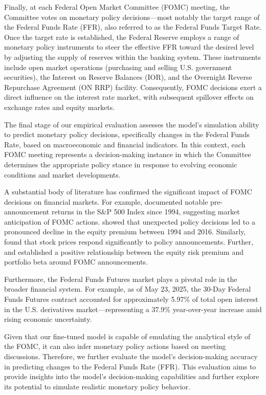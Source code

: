Finally, at each Federal Open Market Committee (FOMC) meeting, the Committee votes on monetary policy decisions—most notably the target range of the Federal Funds Rate (FFR), also referred to as the Federal Funds Target Rate. Once the target rate is established, the Federal Reserve employs a range of monetary policy instruments to steer the effective FFR toward the desired level by adjusting the supply of reserves within the banking system. These instruments include open market operations (purchasing and selling U.S. government securities), the Interest on Reserve Balances (IOR), and the Overnight Reverse Repurchase Agreement (ON RRP) facility. Consequently, FOMC decisions exert a direct influence on the interest rate market, with subsequent spillover effects on exchange rates and equity markets.


The final stage of our empirical evaluation assesses the model’s simulation ability to predict monetary policy decisions, specifically changes in the Federal Funds Rate, based on macroeconomic and financial indicators. In this context, each FOMC meeting represents a decision-making instance in which the Committee determines the appropriate policy stance in response to evolving economic conditions and market developments.


A substantial body of literature has confirmed the significant impact of FOMC decisions on financial markets. For example, \cite{lucca2015pre} documented notable pre-announcement returns in the S\&P 500 Index since 1994, suggesting market anticipation of FOMC actions. \cite{cieslak2019stock} showed that unexpected policy decisions led to a pronounced decline in the equity premium between 1994 and 2016. Similarly, \cite{madeira2019effect} found that stock prices respond significantly to policy announcements. Further, \cite{bodilsen2021asset} and \cite{liu2022recovering} established a positive relationship between the equity risk premium and portfolio beta around FOMC announcements.


Furthermore, the Federal Funds Futures market plays a pivotal role in the broader financial system. For example, as of May 23, 2025, the 30-Day Federal Funds Futures contract accounted for approximately 5.97\% of total open interest in the U.S. derivatives market—representing a 37.9\% year-over-year increase amid rising economic uncertainty.

Given that our fine-tuned model is capable of emulating the analytical style of the FOMC, it can also infer monetary policy actions based on meeting discussions. Therefore, we further evaluate the model’s decision-making accuracy in predicting changes to the Federal Funds Rate (FFR). This evaluation aims to provide insights into the model’s decision-making capabilities and further explore its potential to simulate realistic monetary policy behavior.

